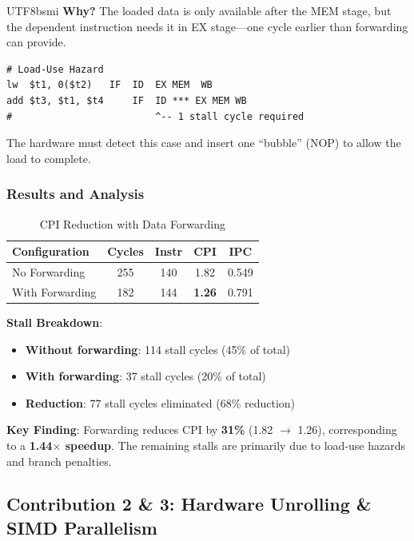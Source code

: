 \documentclass[journal,twoside]{IEEEtran}
\begin{document}
\begin{CJK}{UTF8}{bsmi}
\textbf{Why?} The loaded data is only available after the MEM stage, but the dependent instruction needs it in EX stage---one cycle earlier than forwarding can provide.

\begin{lstlisting}
# Load-Use Hazard
lw  $t1, 0($t2)   IF  ID  EX MEM  WB
add $t3, $t1, $t4     IF  ID *** EX MEM WB
#                         ^-- 1 stall cycle required
\end{lstlisting}

The hardware must detect this case and insert one ``bubble'' (NOP) to allow the load to complete.

\subsubsection{Results and Analysis}
\begin{table}[!t]
\centering
\caption{CPI Reduction with Data Forwarding}
\footnotesize
\begin{tabular}{@{}lcccc@{}}
\toprule
\textbf{Configuration} & \textbf{Cycles} & \textbf{Instr} & \textbf{CPI} & \textbf{IPC} \\
\midrule
No Forwarding & 255 & 140 & 1.82 & 0.549 \\
With Forwarding & 182 & 144 & \textbf{1.26} & 0.791 \\
\bottomrule
\end{tabular}
\end{table}

\textbf{Stall Breakdown}:
\begin{itemize}
    \item \textbf{Without forwarding}: 114 stall cycles (45\% of total)
    \item \textbf{With forwarding}: 37 stall cycles (20\% of total)
    \item \textbf{Reduction}: 77 stall cycles eliminated (68\% reduction)
\end{itemize}

\textbf{Key Finding}: Forwarding reduces CPI by \textbf{31\%} (1.82 $\rightarrow$ 1.26), corresponding to a \textbf{1.44$\times$ speedup}. The remaining stalls are primarily due to load-use hazards and branch penalties.

\subsection{Contribution 2 \& 3: Hardware Unrolling \& SIMD Parallelism}


\end{CJK}
\end{document}
